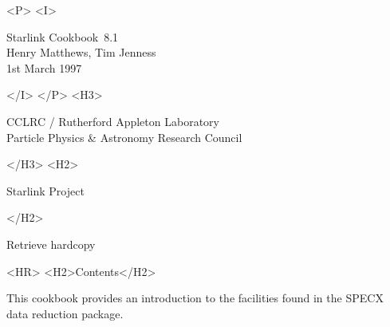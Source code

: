 \documentclass[11pt,twoside]{article}
\newcommand{\stardoccategory}  {Starlink Cookbook}
\newcommand{\stardocinitials}  {SC}
\newcommand{\stardocsource}    {sc\stardocnumber}
\newcommand{\stardocnumber}    {8.1}
\newcommand{\stardocauthors}   {Henry Matthews, Tim Jenness}
\newcommand{\stardocdate}      {1st March 1997}
\newcommand{\stardocabstract}  {%
This cookbook provides an introduction to the facilities
found in the SPECX data reduction package.

}
\newcommand{\stardocname}{\stardocinitials /\stardocnumber}
\newcommand{\htmladdnormallink}[2]{#1}
\newcommand{\htmladdimg}[1]{}
\newenvironment{latexonly}{}{}
\newcommand{\htmlref}[2]{#1}
\newcommand{\htmladdtonavigation}[1]{}
\newcommand{\xlabel}[1]{}
\newcommand{\latexonlytoc}[0]{\tableofcontents}
\renewcommand{\thepage}{\roman{page}}
\begin{document}
\begin{htmlonly}
   \begin{rawhtml} <P> <I> \end{rawhtml}
   \stardoccategory\ \stardocnumber \\
   \stardocauthors \\
   \stardocdate
   \begin{rawhtml} </I> </P> <H3> \end{rawhtml}
      \htmladdnormallink{CCLRC}{http://www.cclrc.ac.uk} /
      \htmladdnormallink{Rutherford Appleton Laboratory}
                        {http://www.cclrc.ac.uk/ral} \\
      \htmladdnormallink{Particle Physics \& Astronomy Research Council}
                        {http://www.pparc.ac.uk} \\
   \begin{rawhtml} </H3> <H2> \end{rawhtml}
      \htmladdnormallink{Starlink Project}{http://star-www.rl.ac.uk/}
   \begin{rawhtml} </H2> \end{rawhtml}
   \htmladdnormallink{\htmladdimg{source.gif} Retrieve hardcopy}
      {http://star-www.rl.ac.uk/cgi-bin/hcserver?\stardocsource}\\

  \label{stardoccontents}
  \begin{rawhtml}
    <HR>
    <H2>Contents</H2>
  \end{rawhtml}
  \renewcommand{\latexonlytoc}[0]{}
  \htmladdtonavigation{\htmlref{\htmladdimg{contents_motif.gif}}
        {stardoccontents}}

\end{htmlonly}

\stardocabstract


 \newpage
 \begin{latexonly}
   \setlength{\parskip}{0mm}
   \latexonlytoc
   \setlength{\parskip}{\medskipamount}
   \markboth{\stardocname}{\stardocname}
 \end{latexonly}
\cleardoublepage
\renewcommand{\thepage}{\arabic{page}}
\setcounter{page}{1}
\end{document}
